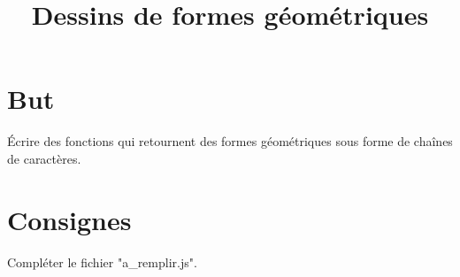 \documentclass{article}
\title{Dessins de formes géométriques}
\date{}
\begin{document}
\maketitle
\section{But}
	Écrire des fonctions qui retournent des formes géométriques sous forme de chaînes de caractères.
\section{Consignes}
	Compléter le fichier "a\_remplir.js".
		
\end{document}
